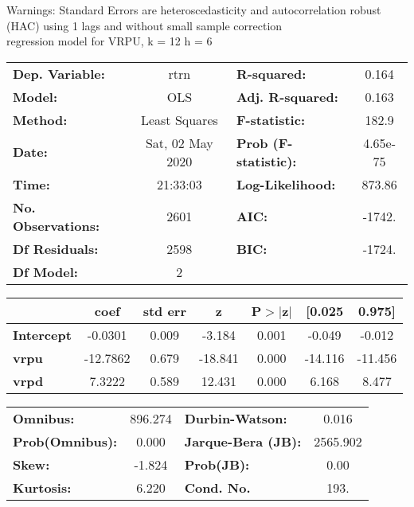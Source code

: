 Warnings: \newline
 [1] Standard Errors are heteroscedasticity and autocorrelation robust (HAC) using 1 lags and without small sample correction\\ 

regression model for VRPU, k = 12 h = 6\begin{center}
\begin{tabular}{lclc}
\toprule
\textbf{Dep. Variable:}    &       rtrn       & \textbf{  R-squared:         } &     0.164   \\
\textbf{Model:}            &       OLS        & \textbf{  Adj. R-squared:    } &     0.163   \\
\textbf{Method:}           &  Least Squares   & \textbf{  F-statistic:       } &     182.9   \\
\textbf{Date:}             & Sat, 02 May 2020 & \textbf{  Prob (F-statistic):} &  4.65e-75   \\
\textbf{Time:}             &     21:33:03     & \textbf{  Log-Likelihood:    } &    873.86   \\
\textbf{No. Observations:} &        2601      & \textbf{  AIC:               } &    -1742.   \\
\textbf{Df Residuals:}     &        2598      & \textbf{  BIC:               } &    -1724.   \\
\textbf{Df Model:}         &           2      & \textbf{                     } &             \\
\bottomrule
\end{tabular}
\begin{tabular}{lcccccc}
                   & \textbf{coef} & \textbf{std err} & \textbf{z} & \textbf{P$> |$z$|$} & \textbf{[0.025} & \textbf{0.975]}  \\
\midrule
\textbf{Intercept} &      -0.0301  &        0.009     &    -3.184  &         0.001        &       -0.049    &       -0.012     \\
\textbf{vrpu}      &     -12.7862  &        0.679     &   -18.841  &         0.000        &      -14.116    &      -11.456     \\
\textbf{vrpd}      &       7.3222  &        0.589     &    12.431  &         0.000        &        6.168    &        8.477     \\
\bottomrule
\end{tabular}
\begin{tabular}{lclc}
\textbf{Omnibus:}       & 896.274 & \textbf{  Durbin-Watson:     } &    0.016  \\
\textbf{Prob(Omnibus):} &   0.000 & \textbf{  Jarque-Bera (JB):  } & 2565.902  \\
\textbf{Skew:}          &  -1.824 & \textbf{  Prob(JB):          } &     0.00  \\
\textbf{Kurtosis:}      &   6.220 & \textbf{  Cond. No.          } &     193.  \\
\bottomrule
\end{tabular}
\end{center}

